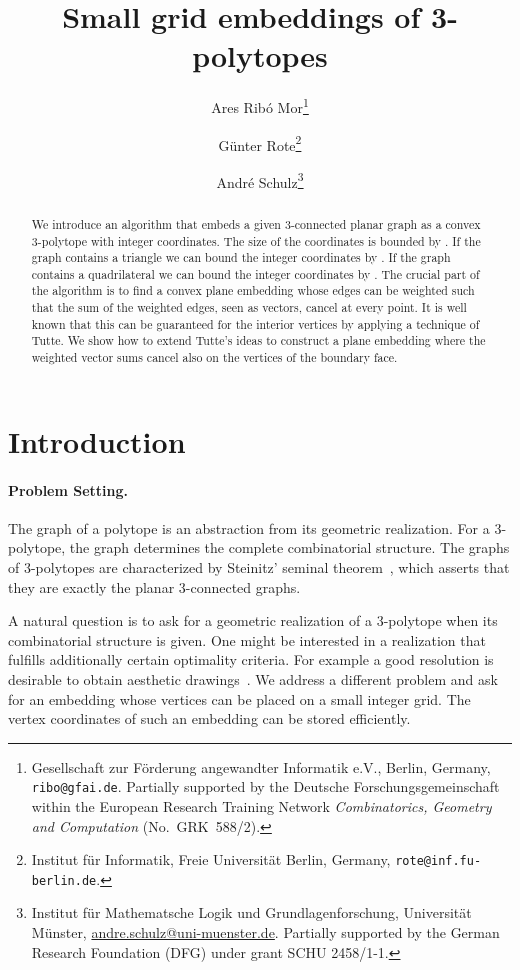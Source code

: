 \documentclass{article}
\title{Small grid embeddings of 3-polytopes}
\author{  Ares {Rib\'o Mor}\thanks{Gesellschaft zur F{\"o}rderung angewandter Informatik e.V., Berlin, Germany,  \texttt{ribo@gfai.de}.
Partially supported by the
Deutsche Forschungsgemeinschaft within the European Research Training Network \emph{Combinatorics,
Geometry and Computation} (No.~GRK~588/2).}
	\and
	G\"unter Rote\thanks{Institut f\"ur Informatik, Freie Universit\"at Berlin, Germany, \texttt{rote}\texttt{@inf.fu-berlin.de}.}
	\and
	Andr\'e Schulz\thanks{Institut f\"ur Mathematsche Logik und Grundlagenforschung, Universit\"at M\"unster, \protect\url{andre.schulz@uni-muenster.de}. Partially supported by
the German Research Foundation (DFG) under grant SCHU 2458/1-1.}
}
\theoremstyle{plain} \newtheorem{thm}{Theorem}[section]
\begin{document}
\maketitle


\begin{abstract}
We introduce an algorithm that embeds a given 3-connected planar graph as a convex 3-polytope with integer coordinates. The size of the  coordinates is bounded by . If the graph contains a triangle we can bound the integer coordinates by . If the graph contains a quadrilateral we can bound the integer coordinates by . The crucial part of the algorithm is to find a convex plane embedding whose edges can be weighted such that the sum of the weighted edges, seen as vectors, cancel at every point. It is well known that this can be guaranteed for the interior vertices by applying a technique of Tutte. We show how to extend Tutte's ideas to construct a plane embedding where the weighted vector sums cancel also on the vertices of the boundary face. 
\end{abstract}

\section{Introduction}

\paragraph{Problem Setting.}
The graph of a polytope is an abstraction from its geometric realization.
For a 3-polytope,
 the graph determines the complete combinatorial structure.
The graphs of 3-polytopes are characterized by Steinitz' seminal
 theorem~\cite{s-emw-22}, which asserts that they are exactly the planar 3-connected graphs.



A natural question is to ask for a geometric realization of a 3-polytope when its combinatorial structure is given. One might be interested in a realization that fulfills additionally certain optimality criteria. For example a good resolution is desirable to obtain aesthetic drawings~\cite{cgt-cdgtt-96,s-dpgvr-09}. 
We address a different problem and ask for an embedding whose vertices can be placed on a small integer grid. The vertex coordinates of such an embedding can be stored efficiently.
\end{document}

